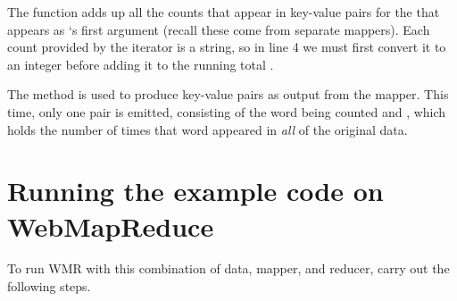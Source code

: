 \documentclass[letterpaper,10pt,openany,oneside]{sphinxmanual}
\begin{document}
The  function adds up all the counts that appear in
key-value pairs for the  that appears as `s
first argument (recall these come from separate mappers). Each
count provided by the iterator  is a string, so in line 4
we must first convert it to an integer before adding it to the
running total .

The method  is used to produce key-value pairs as
output from the mapper. This time, only one pair is emitted,
consisting of the word being counted and , which holds the
number of times that word appeared in \emph{all} of the original data.


\section{Running the example code on WebMapReduce}
\label{wmr_basic/wmr_multi_language:running-the-example-code-on-webmapreduce}
To run WMR with this combination of data, mapper, and reducer,
carry out the following steps.
\end{document}
